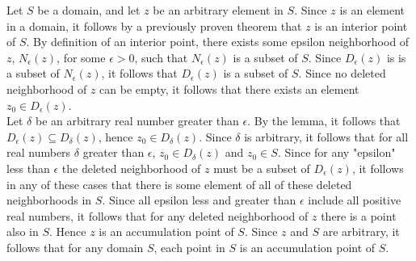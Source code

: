 \documentclass{article}
\theoremstyle{definition}
\newcommand{\cs}[1]{\color{blue}{#1}\normalcolor}
\begin{document}
 Let $S$ be a domain, and let $z$ be an arbitrary element in $S$. Since $z$ is an element in a domain, it follows by a previously proven theorem that $z$ is an interior point of $S$. By definition of an interior point, there exists some epsilon neighborhood of $z$, $N_\epsilon(z)$, for some $\epsilon > 0$, such that $N_\epsilon(z)$ is a subset of $S$. Since $D_\epsilon(z)$ is is a subset of $N_\epsilon(z)$, it follows that $D_\epsilon(z)$ is a subset of $S$. Since no deleted neighborhood of $z$ can be empty, it follows that there exists an element $z_0\in D_\epsilon(z)$. \\
Let $\delta$ be an arbitrary real number greater than $\epsilon$. By the lemma, it follows that $D_\epsilon(z)\subseteq D_\delta(z)$, hence $z_0\in D_\delta(z)$. Since $\delta$ is arbitrary, it follows that for all real numbers $\delta$ greater than $\epsilon$, $z_0\in D_\delta(z)$ and $z_0\in S$. Since for any "epsilon" less than $\epsilon$ the deleted neighborhood of $z$ must be a subset of $D_\epsilon(z)$, it follows in any of these cases that there is some element of all of these deleted neighborhoods in $S$. Since all epsilon less and greater than $\epsilon$ include all positive real numbers, it follows that for any deleted neighborhood of $z$ there is a point also in $S$. Hence $z$ is an accumulation point of $S$. Since $z$ and $S$ are arbitrary, it follows that for any domain $S$, each point in $S$ is an accumulation point of $S$. 

\cs{5/5}
\end{document}
